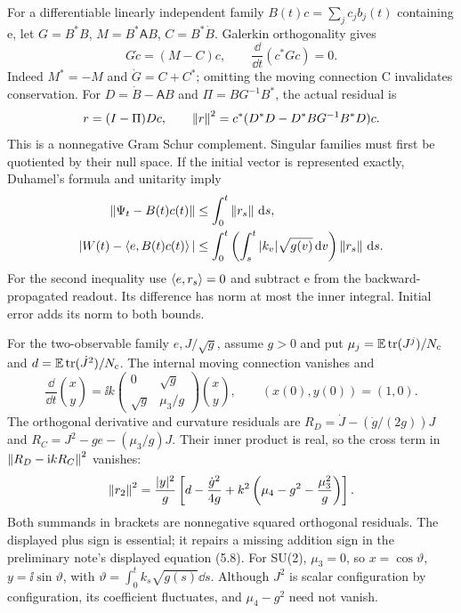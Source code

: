 For a differentiable linearly independent family
$B(t)c=\sum_jc_jb_j(t)$ containing e, let
$G=B^*B$, $M=B^*\mathsf AB$, $C=B^*\dot B$.
Galerkin orthogonality gives
\begin{equation}
G\dot c=(M-C)c,\qquad
\frac{\dd}{\dd t}(c^*Gc)=0 .
\end{equation}
Indeed $M^*=-M$ and $\dot G=C+C^*$; omitting the moving
connection C invalidates conservation. For
$D=\dot B-\mathsf AB$ and $\Pi=BG^{-1}B^*$, the actual
residual is
\begin{equation}
r=(I-\Pi)Dc,\qquad
\left\lVert r\right\rVert^2=c^*(D^*D-D^*BG^{-1}B^*D)c .
\end{equation}
This is a nonnegative Gram Schur complement. Singular
families must first be quotiented by their null space.
If the initial vector is represented exactly, Duhamel's
formula and unitarity imply
\begin{align}
\left\lVert\Psi_t-B(t)c(t)\right\rVert&\le\int_0^t\left\lVert r_s\right\rVert\,\mathrm d s,\\
|W(t)-\left\langle e,B(t)c(t)\right\rangle|
&\le\int_0^t\left(\int_s^t|k_v|\sqrt{g(v)}\,\mathrm d v\right)
                                          \left\lVert r_s\right\rVert\,\mathrm d s.
\end{align}
For the second inequality use $\left\langle e,r_s\right\rangle=0$ and subtract
e from the backward-propagated readout. Its difference
has norm at most the inner integral. Initial error adds
its norm to both bounds.

For the two-observable family $e,J/\sqrt g$, assume $g>0$
and put $\mu_j=\mathbb E\operatorname{tr}(J^j)/N_c$ and
$d=\mathbb E\operatorname{tr}(\dot J^2)/N_c$. The internal moving
connection vanishes and
\begin{equation}
\frac{\dd}{\dd t}\binom{x}{y}
=\ii k\begin{pmatrix}0&\sqrt g\\\sqrt g&\mu_3/g\end{pmatrix}
\binom{x}{y},\qquad (x(0),y(0))=(1,0).
\end{equation}
The orthogonal derivative and curvature residuals are
$R_D=\dot J-(\dot g/(2g))J$ and
$R_C=J^2-ge-(\mu_3/g)J$. Their inner product is real,
so the cross term in $\left\lVert R_D-\mathrm i kR_C\right\rVert^2$ vanishes:
\begin{equation}\label{eq:two-mode-residual}
\left\lVert r_2\right\rVert^2=\frac{|y|^2}{g}
\left[d-\frac{\dot g^2}{4g}
+k^2\left(\mu_4-g^2-\frac{\mu_3^2}{g}\right)\right].
\end{equation}
Both summands in brackets are nonnegative squared
orthogonal residuals. The displayed plus sign is
essential; it repairs a missing addition sign in the
preliminary note's displayed equation (5.8).
For SU(2), $\mu_3=0$, so
$x=\cos\vartheta$, $y=\ii\sin\vartheta$, with
$\vartheta=\int_0^tk_s\sqrt{g(s)}\dd s$.
Although $J^2$ is scalar configuration by configuration,
its coefficient fluctuates, and $\mu_4-g^2$ need not vanish.

